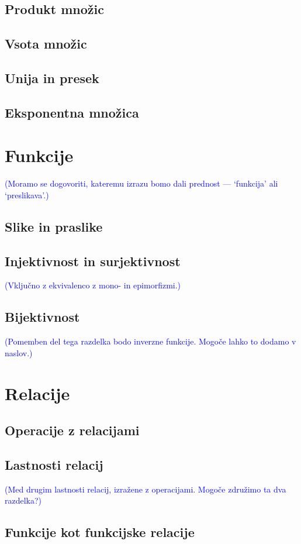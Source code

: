 \documentclass[11pt,a4paper,twoside]{book}
\newcommand{\note}[1]{{\small\textcolor{blue}{(#1)}}}
\begin{document}
		\section{Produkt množic}
		\section{Vsota množic}
		\section{Unija in presek}
		\section{Eksponentna množica}
	
	\chapter{Funkcije}
		\note{Moramo se dogovoriti, kateremu izrazu bomo dali prednost --- `funkcija' ali `preslikava'.}
		\section{Slike in praslike}
		\section{Injektivnost in surjektivnost}
			\note{Vključno z ekvivalenco z mono- in epimorfizmi.}
		\section{Bijektivnost}
			\note{Pomemben del tega razdelka bodo inverzne funkcije. Mogoče lahko to dodamo v naslov.}
	
	\chapter{Relacije}
		\section{Operacije z relacijami}
		\section{Lastnosti relacij}
			\note{Med drugim lastnosti relacij, izražene z operacijami. Mogoče združimo ta dva razdelka?}
		\section{Funkcije kot funkcijske relacije}
\end{document}
